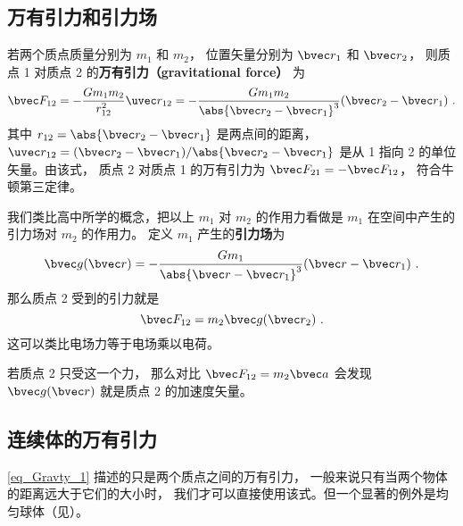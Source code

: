 

\subsection{万有引力和引力场}

若两个质点质量分别为 $m_1$ 和 $m_2$， 位置矢量分别为 $\bvec r_1$ 和 $\bvec r_2$， 则质点 1 对质点 2 的\textbf{万有引力（gravitational force）} 为
\begin{equation}\label{eq_Gravty_1}
\bvec F_{12} =  - \frac{G m_1 m_2}{r_{12}^2} \uvec r_{12} = - \frac{G m_1 m_2}{\abs{\bvec r_2 - \bvec r_1}^3}(\bvec r_2 - \bvec r_1)~.
\end{equation}
其中 $r_{12} = \abs{\bvec r_2 - \bvec r_1}$ 是两点间的距离，$\uvec r_{12} = (\bvec r_2 - \bvec r_1)/\abs{\bvec r_2 - \bvec r_1}$ 是从 1 指向 2 的单位矢量。由该式， 质点 2 对质点 1 的万有引力为 $\bvec F_{21} = -\bvec F_{12}$， 符合牛顿第三定律。

我们类比高中所学的概念，把以上 $m_1$ 对 $m_2$ 的作用力看做是 $m_1$ 在空间中产生的引力场对 $m_2$ 的作用力。 定义 $m_1$ 产生的\textbf{引力场}为
\begin{equation}\label{eq_Gravty_2}
\bvec g(\bvec r) = -\frac{Gm_1}{\abs{\bvec r - \bvec r_1} ^3}(\bvec r - \bvec r_1)~.
\end{equation}
那么质点 2 受到的引力就是
\begin{equation}
\bvec F_{12} =  m_2\bvec g(\bvec r_2)~.
\end{equation}
这可以类比电场力等于电场乘以电荷。

若质点 2 只受这一个力， 那么对比 $\bvec F_{12} =  m_2\bvec a$ 会发现 $\bvec g(\bvec r)$ 就是质点 2 的加速度矢量。

\subsection{连续体的万有引力}
\autoref{eq_Gravty_1} 描述的只是两个质点之间的万有引力， 一般来说只有当两个物体的距离远大于它们的大小时， 我们才可以直接使用该式。但一个显著的例外是均匀球体（见）。

